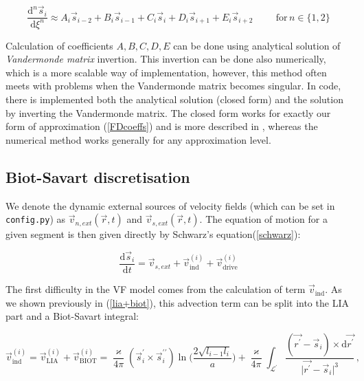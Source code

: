\begin{equation}
\frac{\text{d}^n\vec{s}_i}{\text{d}\xi^n} \approx
A_i\vec{s}_{i-2} +
B_i\vec{s}_{i-1} +
C_i\vec{s}_{i} +
D_i\vec{s}_{i+1} +
E_i\vec{s}_{i+2}
\hspace{1cm}
\text{for} \,n\in\{1,2\}
\label{FDcoeffs}
\end{equation}

Calculation of coefficients $A, B, C, D, E$ can be done using analytical solution of \textit{Vandermonde matrix} invertion. This invertion can be done also numerically, which is a more scalable way of implementation, however, this method often meets with problems when the Vandermonde matrix becomes singular.
In code, there is implemented both the analytical solution (closed form) and the solution by inverting the Vandermonde matrix. The closed form works for exactly our form of approximation (\ref{FDcoeffs}) and is more described in \cite{FDclosed}, whereas the numerical method works generally for any approximation level.

\subsection*{Biot-Savart discretisation}

We denote the dynamic external sources of velocity fields (which can be set in \texttt{config.py}) as $\vec{v}_{n,ext}(\vec{r}, t)$ and $\vec{v}_{s,ext} (\vec{r}, t)$. The equation of motion for a given segment is then given directly by Schwarz's equation(\ref{schwarz}):

\begin{equation}
\frac{\text{d}\vec{s}_i}{\text{d}t} =
\vec{v}_{s,ext} + \vec{v}_{\text{ind}}^{(i)} + \vec{v}_{\text{drive}}^{(i)}
\end{equation}

The first difficulty in the VF model comes from the calculation of term $\vec{v}_{\text{ind}}$. As we shown previously in (\ref{lia+biot}), this advection term can be split into the LIA part and a Biot-Savart integral:

\begin{equation}
\vec{v}_{\text{ind}}^{(i)} =
\vec{v}_{\text{LIA}}^{(i)} + \vec{v}_{\text{BIOT}}^{(i)} =
\frac{\varkappa}{4\pi} (\vec{s}^{\prime}_i \times \vec{s}^{\prime \prime}_i)
\ln{\Bigg(\frac{2\sqrt{l_{i-1} l_i}}{a}\Bigg)}
+ \frac{\varkappa}{4\pi} \int_{\mathcal{L}^{\prime}} \frac{(\vec{r^{\prime}} - \vec{s}_i) \times \text{d}\vec{r^{\prime}}}{\vert \vec{r^{\prime}} - \vec{s}_i \vert^3}\,,
\end{equation}


